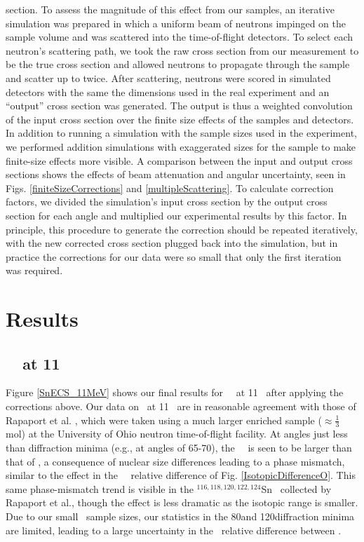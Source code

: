 section. To assess the magnitude of this effect from our
samples, an iterative simulation was prepared in which a uniform beam of neutrons
impinged on the sample volume and was scattered into the time-of-flight
detectors. To select each neutron's scattering path, we took the
raw cross section from our measurement to be the true cross section and allowed
neutrons to propagate through the sample and scatter up to twice. After
scattering, neutrons were scored in simulated detectors with the same the dimensions
used in the real experiment and an ``output'' cross section was generated. The
output is thus a weighted convolution of the input cross section
over the finite size effects of the samples and detectors. In addition to
running a simulation with the sample sizes used in the experiment, we performed
addition simulations with exaggerated sizes for the
sample to make finite-size effects more visible. A comparison between the input
and output cross sections shows the effects of beam attenuation and angular
uncertainty, seen in Figs. \ref{finiteSizeCorrections} and
\ref{multipleScattering}.
To calculate correction factors, we divided the simulation's
input cross section by the output cross section for each angle and multiplied our
experimental results by this factor. In principle, this procedure to generate
the correction should be repeated iteratively, with the new corrected cross
section plugged back into the simulation, but in practice the corrections for
our data were so small that only the first iteration was required.
\section{Results}
\subsection{\snTwelveFour\ \el\ at 11 \mega\electronvolt}
Figure \ref{SnECS_11MeV} shows our final results for \snTwelveFour\
\el\ at 11 \mega\electronvolt\ after applying the corrections above. Our data on \snFour\
at 11 \mega\electronvolt\ are in reasonable agreement with those of Rapaport et al.
\cite{Rapaport1980}, which were taken using a much larger enriched sample
($\approx\frac{1}{3}$ mol) at the University of Ohio neutron time-of-flight
facility. At angles just less than diffraction minima (e.g., at
angles of 65-70\textdegree), the \snTwelve\ \el\ is seen to be larger
than that of \snFour, a consequence of nuclear size
differences leading to a phase mismatch, similar to the effect in the \oSixEight\
\tot\ relative difference of Fig. \ref{IsotopicDifferenceO}. This same
phase-mismatch trend is
visible in the $^{116,118,120,122,124}$Sn \el\ collected by Rapaport et al.,
though the effect is less dramatic as the isotopic range is smaller.
Due to our small \snTwelveFour\ sample sizes,
our statistics in the 80\textdegree and 120\textdegree diffraction minima are
limited, leading to a large uncertainty in the \el\ relative difference between
\snTwelveFour.

